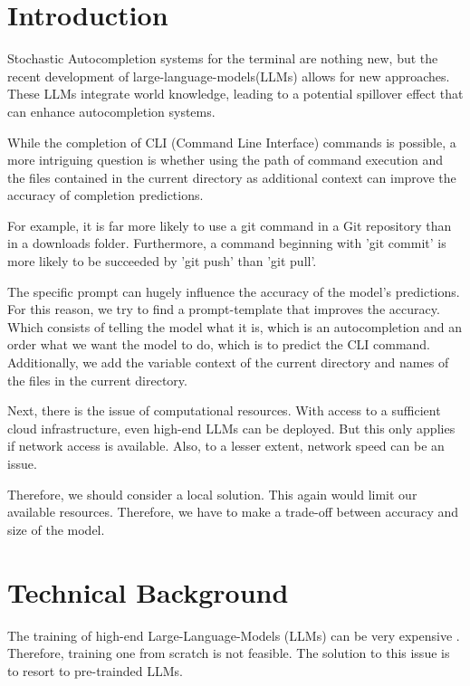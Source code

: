 \section{Introduction}

Stochastic Autocompletion systems for the terminal are nothing new, but the recent development of large-language-models(LLMs) allows for new approaches. These LLMs integrate world knowledge, leading to a potential spillover effect that can enhance autocompletion systems.



While the completion of CLI (Command Line Interface) commands is possible, a more intriguing question is whether using the path of command execution and the files contained in the current directory as additional context can improve the accuracy of completion predictions.


For example, it is far more likely to use a git command in a Git repository than in a downloads folder. Furthermore, a command beginning with 'git commit' is more likely to be succeeded by 'git push' than 'git pull'.



The specific prompt can hugely influence the accuracy of the model's predictions.
For this reason, we try to find a prompt-template that improves the accuracy.
Which consists of telling the model what it is, which is an autocompletion and an order what we want the model to do, which is to predict the CLI command. Additionally, we add the variable context of the current directory and names of the files in the current directory. 



Next, there is the issue of computational resources. With access to a sufficient cloud infrastructure, even high-end LLMs can be deployed. But this only applies if network access is available. Also, to a lesser extent, network speed can be an issue. 

Therefore, we should consider a local solution. This again would limit our available resources. Therefore, we have to make a trade-off between accuracy and size of the model.

\section{Technical Background}

The training of high-end Large-Language-Models (LLMs) can be very expensive \cite{sharir2020cost}. Therefore, training one from scratch is not feasible.
The solution to this issue is to resort to pre-trainded LLMs. 



